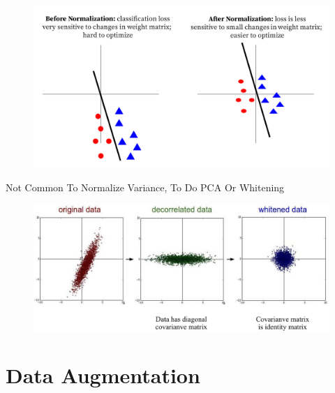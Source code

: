 \documentclass[serif, aspectratio=169]{beamer}
\begin{document}
\begin{frame}
	\begin{figure}[htpb]
		\begin{center}
			\includegraphics[keepaspectratio, scale=0.3]{pic/normaliz2}
		\end{center}
	\end{figure}	
\end{frame}


\begin{frame}{Not Common To Normalize Variance, To Do PCA Or Whitening}
	\begin{figure}[htpb]
		\begin{center}
			\includegraphics[keepaspectratio, scale=0.35]{pic/whiten}
		\end{center}
	\end{figure}	
\end{frame}

\section{Data Augmentation}
\end{document}
